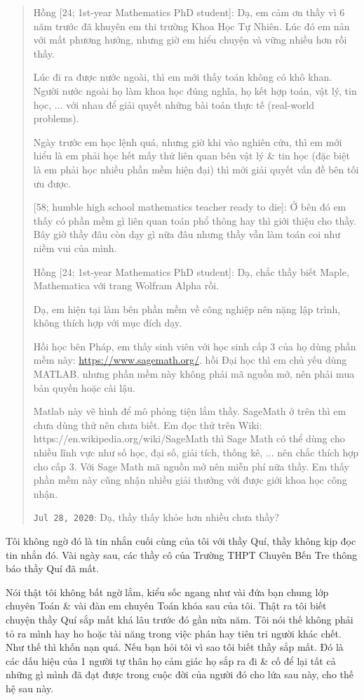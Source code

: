 \documentclass[12pt,twoside]{book}
\begin{document}
\begin{quote}
	{\sf Hồng [24; 1st-year Mathematics PhD student]}: Dạ, em cảm ơn thầy vì 6 năm trước đã khuyên em thi trường Khoa Học Tự Nhiên. Lúc đó em nản với mất phương hướng, nhưng giờ em hiểu chuyện và vững nhiều hơn rồi thầy.
	
	Lúc đi ra được nước ngoài, thì em mới thấy toán không có khô khan. Người nước ngoài họ làm khoa học đúng nghĩa, họ kết hợp toán, vật lý, tin học, $\ldots$ với nhau để giải quyết những bài toán thực tế (real-world problems).
	
	Ngày trước em học lệnh quá, nhưng giờ khi vào nghiên cứu, thì em mới hiểu là em phải học hết mấy thứ liên quan bên vật lý \& tin học (đặc biệt là em phải học nhiều phần mềm hiện đại) thì mới giải quyết vấn đề bên tối ưu được.
	
	{ [58; humble high school mathematics teacher ready to die]}: Ở bên đó em thấy có phần mềm gì liên quan toán phổ thông hay thì giới thiệu cho thầy. Bây giờ thầy đâu còn dạy gì nữa đâu nhưng thầy vẫn làm toán coi như niềm vui của mình.
	
	{\sf Hồng [24; 1st-year Mathematics PhD student]}: Dạ, chắc thầy biết Maple, Mathematica với trang Wolfram Alpha rồi.
	
	Dạ, em hiện tại làm bên phần mềm về công nghiệp nên nặng lập trình, không thích hợp với mục đích dạy.
	
	Hồi học bên Pháp, em thấy sinh viên với học sinh cấp 3 của họ dùng phần mềm này: \url{https://www.sagemath.org/}. hồi Đại học thì em chủ yếu dùng MATLAB. nhưng phần mềm này không phải mã nguồn mở, nên phải mua bản quyền hoặc cài lậu.
	
	Matlab này vẽ hình để mô phỏng tiện lắm thầy. SageMath ở trên thì em chưa dùng thử nên chưa biết. Em đọc thử trên Wiki: https://en.wikipedia.org/wiki/SageMath thì Sage Math có thể dùng cho nhiều lĩnh vực như số học, đại số, giải tích, thống kê, ... nên chắc thích hợp cho cấp 3. Với Sage Math mã nguồn mở nên miễn phí nữa thầy. Em thấy phần mềm này cũng nhận nhiều giải thưởng với được giới khoa học công nhận.
	
	{\tt Jul 28, 2020}: Dạ, thầy thấy khỏe hơn nhiều chưa thầy?
\end{quote}
Tôi không ngờ đó là tin nhắn cuối cùng của tôi với thầy {\sc Quí}, thầy không kịp đọc tin nhắn đó. Vài ngày sau, các thầy cô của Trường THPT Chuyên Bến Tre thông báo thầy {\sc Quí} đã mất.

Nói thật tôi không bất ngờ lắm, kiểu sốc ngang như vài đứa bạn chung lớp chuyên Toán \& vài đàn em chuyên Toán khóa sau của tôi. Thật ra tôi biết chuyện thầy {\sc Quí} sắp mất khá lâu trước đó gần nửa năm. Tôi nói thế không phải tỏ ra mình hay ho hoặc tài năng trong việc phán hay tiên tri người khác chết. Như thế thì khốn nạn quá. Nếu bạn hỏi tôi vì sao tôi biết thầy sắp mất. Đó là các dấu hiệu của 1 người tự thân họ cảm giác họ sắp ra đi \& cố để lại tất cả những gì mình đã đạt được trong cuộc đời của người đó cho lứa sau này, cho thế hệ sau này.
\end{document}
